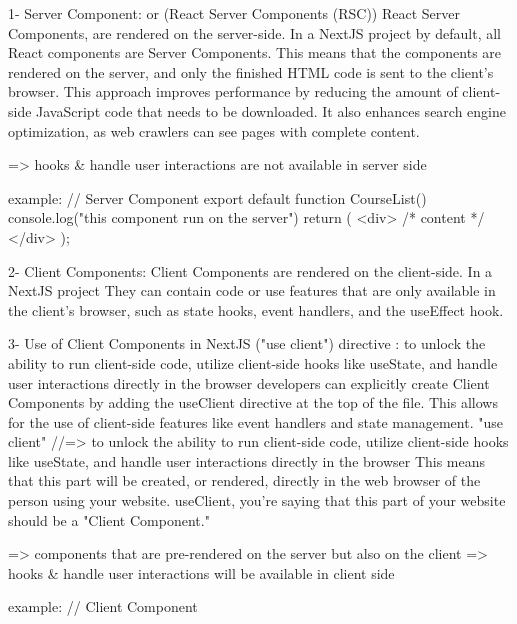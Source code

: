     1- Server Component: or (React Server Components (RSC))
            React Server Components, are rendered on the server-side. In a NextJS project
            by default, all React components are Server Components.
            This means that the components are rendered on the server, and only the finished HTML code is sent to the client's browser. 
            This approach improves performance by reducing the amount of client-side JavaScript code that needs to be downloaded. 
            It also enhances search engine optimization, as web crawlers can see pages with complete content.

           => hooks & handle user interactions are not available in server side

            example: // Server Component
                    export default function CourseList() {
                        console.log("this component run on the server")
                    return (
                        <div>
                        {/* content */}
                        </div>
                    );
                     }

    2- Client Components: 
        Client Components are rendered on the client-side. In a NextJS project
        They can contain code or use features that are only available in the client's browser, such as state hooks, event handlers, and the useEffect hook.
    
    3- Use of Client Components in NextJS ("use client") directive :
            to unlock the ability to run client-side code, utilize client-side hooks like useState, and handle user interactions directly in the browser
            developers can explicitly create Client Components by adding the useClient directive at the top of the file.
            This allows for the use of client-side features like event handlers and state management.
            "use client" //=> to unlock the ability to run client-side code, utilize client-side hooks like useState, and handle user interactions directly in the browser
            This means that this part will be created, or rendered, directly in the web browser of the person using your website. useClient, you're saying that this part of your website should be a "Client Component." 

            => components that are pre-rendered on the server but also on the client
            => hooks & handle user interactions will be available in client side



            example: // Client Component
                
